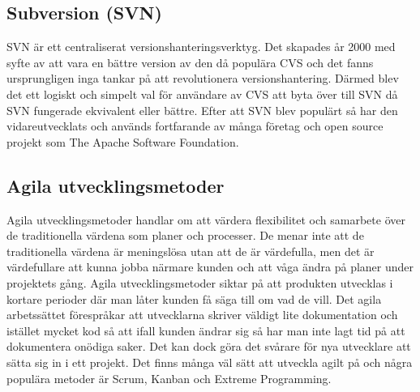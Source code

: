 \subsection{Subversion (SVN)}
SVN är ett centraliserat versionshanteringsverktyg. Det skapades år 2000 med syfte av att vara en bättre version av den då populära CVS och det fanns ursprungligen inga tankar på att revolutionera versionshantering. Därmed blev det ett logiskt och simpelt val för användare av CVS att byta över till SVN då SVN fungerade ekvivalent eller bättre. Efter att SVN blev populärt så har den vidareutvecklats och används fortfarande av många företag\cite{vcs-popularity} och open source projekt som The Apache Software Foundation\cite{apache-dev-svn}.\cite{svn-book}

\subsection{Agila utvecklingsmetoder}
Agila utvecklingsmetoder handlar om att värdera flexibilitet och samarbete över de traditionella värdena som planer och processer. De menar inte att de traditionella värdena är meningslösa utan att de är värdefulla, men det är värdefullare att kunna jobba närmare kunden och att våga ändra på planer under projektets gång. Agila utvecklingsmetoder siktar på att produkten utvecklas i kortare perioder där man låter kunden få säga till om vad de vill. Det agila arbetssättet förespråkar att utvecklarna skriver väldigt lite dokumentation och istället mycket kod så att ifall kunden ändrar sig så har man inte lagt tid på att dokumentera onödiga saker. Det kan dock göra det svårare för nya utvecklare att sätta sig in i ett projekt.
Det finns många väl sätt att utveckla agilt på och några populära metoder är Scrum, Kanban och Extreme Programming.\cite{agile101}